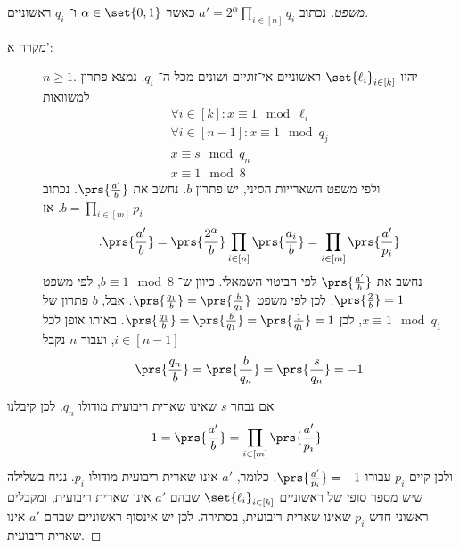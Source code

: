\documentclass[a4paper,10pt,twoside,openany]{book}
\begin{document}
\begin{proof}[משפט]
נכתוב
$a' = 2^{\alpha} \prod_{i \in [n]} q_i$
כאשר
$\alpha \in \set{0,1}$
ו־%
$q_i$
ראשוניים.

\begin{description}
\item[מקרה א':]
$n \geq 1$.
יהיו
$\set{\ell_i}_{i \in [k]}$
ראשוניים אי־זוגיים ושונים מכל ה־%
$q_i$.
נמצא פתרון למשוואות
\begin{align*}
\forall i \in [k] \colon x \equiv 1 \mod{\ell_i} \\
\forall i \in [n-1] \colon x \equiv 1 \mod{q_j} \\
x \equiv s \mod{q_n} \\
x \equiv 1 \mod{8}
\end{align*}
ולפי משפט השארייות הסיני, יש פתרון
$b$.
נחשב את
$\prs{\frac{a'}{b}}$.
נכתוב
$b = \prod_{i \in [m]} p_i$.
אז
\[\text{.}\prs{\frac{a'}{b}} = \prs{\frac{2^\alpha}{b}} \prod_{i\in[n]} \prs{\frac{a_i}{b}} = \prod_{i\in[m]} \prs{\frac{a'}{p_i}}\]
נחשב את
$\prs{\frac{a'}{b}}$
לפי הביטוי השמאלי.
כיוון ש־%
$b \equiv 1 \mod{8}$,
לפי משפט
$\prs{\frac{2}{b}} = 1$.
לכן לפי משפט
$\prs{\frac{q_1}{b}} = \prs{\frac{b}{q_1}}$.
אבל,
$b$
פתרון של
$x \equiv 1 \mod{q_1}$,
לכן
$\prs{\frac{q_1}{b}} = \prs{\frac{b}{q_1}} = \prs{\frac{1}{q_1}} = 1$.
באותו אופן לכל
$i \in [n-1]$,
ועבור
$n$
נקבל
\[\prs{\frac{q_n}{b}} = \prs{\frac{b}{q_n}} = \prs{\frac{s}{q_n}} = -1\]
\end{description}
אם נבחר
$s$
שאינו שארית ריבועית מודולו
$q_n$.
לכן קיבלנו
\[-1 = \prs{\frac{a'}{b}} = \prod_{i \in [m]} \prs{\frac{a'}{p_i}}\]
ולכן קיים
$p_i$
עבורו
$\prs{\frac{a'}{p_i}} = -1$.
כלומר,
$a'$
אינו שארית ריבועית מודולו
$p_i$.
נניח בשלילה שיש מספר סופי של ראשוניים
$\set{\ell_i}_{i \in [k]}$
שבהם
$a'$
אינו שארית ריבועית, ומקבלים ראשוני חדש
$p_i$
שאינו שארית ריבועית, בסתירה.
לכן יש אינסוף ראשוניים שבהם
$a'$
אינו שארית ריבועית.
\end{proof}

\end{document}
